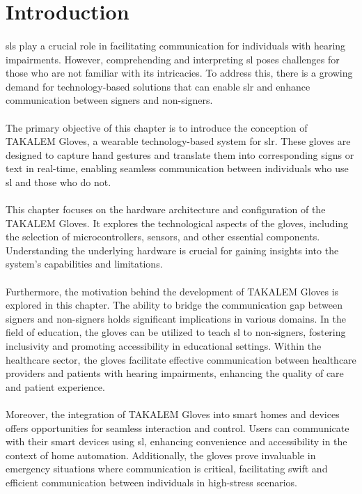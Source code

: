 \section{Introduction}
\paragraph{}
\ac{sl}s play a crucial role in facilitating communication for individuals with hearing impairments. However, comprehending and interpreting \ac{sl} poses challenges for those who are not familiar with its intricacies. To address this, there is a growing demand for technology-based solutions that can enable \ac{slr} and enhance communication between signers and non-signers.
\paragraph{}
The primary objective of this chapter is to introduce the conception of TAKALEM Gloves, a wearable technology-based system for \ac{slr}. These gloves are designed to capture hand gestures and translate them into corresponding signs or text in real-time, enabling seamless communication between individuals who use \ac{sl} and those who do not.
\paragraph{}
This chapter focuses on the hardware architecture and configuration of the TAKALEM Gloves. It explores the technological aspects of the gloves, including the selection of microcontrollers, sensors, and other essential components. Understanding the underlying hardware is crucial for gaining insights into the system's capabilities and limitations.
\paragraph{}
Furthermore, the motivation behind the development of TAKALEM Gloves is explored in this chapter. The ability to bridge the communication gap between signers and non-signers holds significant implications in various domains. In the field of education, the gloves can be utilized to teach \ac{sl} to non-signers, fostering inclusivity and promoting accessibility in educational settings. Within the healthcare sector, the gloves facilitate effective communication between healthcare providers and patients with hearing impairments, enhancing the quality of care and patient experience.
\paragraph{}
Moreover, the integration of TAKALEM Gloves into smart homes and devices offers opportunities for seamless interaction and control. Users can communicate with their smart devices using \ac{sl}, enhancing convenience and accessibility in the context of home automation. Additionally, the gloves prove invaluable in emergency situations where communication is critical, facilitating swift and efficient communication between individuals in high-stress scenarios.

